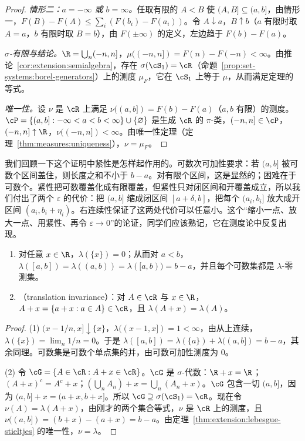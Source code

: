\begin{proof}
\emph{情形二：$a=-\infty$ 或 $b=\infty$。}任取有限的 $A<B$ 使 $(A,B]\subseteq(a,b]$，由情形一，$F(B)-F(A)\leqslant\sum_i(F(b_i)-F(a_i))$。令 $A\downarrow a$，$B\uparrow b$（$a$ 有限时取 $A=a$，$b$ 有限时取 $B=b$），由 $F(\pm\infty)$ 的定义，左边趋于 $F(b)-F(a)$。

\emph{$\sigma$-有限与结论。}$\R=\bigcup_n(-n,n]$，$\mu((-n,n])=F(n)-F(-n)<\infty$。由推论~\ref{cor:extension:semialgebra}，存在 $\sigma(\cS_1)=\cR$（命题~\ref{prop:set-systems:borel-generators}）上的测度 $\mu_F$，它在 $\cS_1$ 上等于 $\mu$，从而满足定理的等式。

\emph{唯一性。}设 $\nu$ 是 $\cR$ 上满足 $\nu((a,b])=F(b)-F(a)$（$a,b$ 有限）的测度。$\cP=\{(a,b]:-\infty<a<b<\infty\}\cup\{\varnothing\}$ 是生成 $\cR$ 的 $\pi$-类，$(-n,n]\in\cP$，$(-n,n]\uparrow\R$，$\nu((-n,n])<\infty$。由唯一性定理（定理~\ref{thm:measures:uniqueness}），$\nu=\mu_F$。
\end{proof}

\begin{remark}
我们回顾一下这个证明中紧性是怎样起作用的。可数次可加性要求：若 $(a,b]$ 被可数个区间盖住，则长度之和不小于 $b-a$。对有限个区间，这是显然的；困难在于可数个。紧性把可数覆盖化成有限覆盖，但紧性只对闭区间和开覆盖成立，所以我们付出了两个 $\varepsilon$ 的代价：把 $(a,b]$ 缩成闭区间 $[a+\delta,b]$，把每个 $(a_i,b_i]$ 放大成开区间 $(a_i,b_i+\eta_i)$。右连续性保证了这两处代价可以任意小。这个“缩小一点、放大一点、用紧性、再令 $\varepsilon\to0$”的论证，同学们应该熟记，它在测度论中反复出现。
\end{remark}

\begin{proposition}\label{prop:extension:lebesgue}
\begin{enumerate}
\item 对任意 $x\in\R$，$\lambda(\{x\})=0$；从而对 $a<b$，$\lambda([a,b])=\lambda((a,b))=\lambda([a,b))=b-a$，并且每个可数集都是 $\lambda$-零测集。
\item {}（translation invariance）：对 $A\in\cR$ 与 $x\in\R$，$A+x=\{a+x:a\in A\}\in\cR$，且 $\lambda(A+x)=\lambda(A)$。
\end{enumerate}
\end{proposition}
\begin{proof}
(1) $(x-1/n,x]\downarrow\{x\}$，$\lambda((x-1,x])=1<\infty$，由从上连续，$\lambda(\{x\})=\lim_n1/n=0$。于是 $\lambda([a,b])=\lambda(\{a\})+\lambda((a,b])=b-a$，其余同理。可数集是可数个单点集的并，由可数可加性测度为 $0$。

(2) 令 $\cG=\{A\in\cR: A+x\in\cR\}$。$\cG$ 是 $\sigma$-代数：$\R+x=\R$；$(A+x)^c=A^c+x$；$(\bigcup_nA_n)+x=\bigcup_n(A_n+x)$。$\cG$ 包含一切 $(a,b]$，因为 $(a,b]+x=(a+x,b+x]$。所以 $\cG\supseteq\sigma(\cS_1)=\cR$。现在令 $\nu(A)=\lambda(A+x)$，由刚才的两个集合等式，$\nu$ 是 $\cR$ 上的测度，且 $\nu((a,b])=(b+x)-(a+x)=b-a$。由定理~\ref{thm:extension:lebesgue-stieltjes} 的唯一性，$\nu=\lambda$。
\end{proof}

